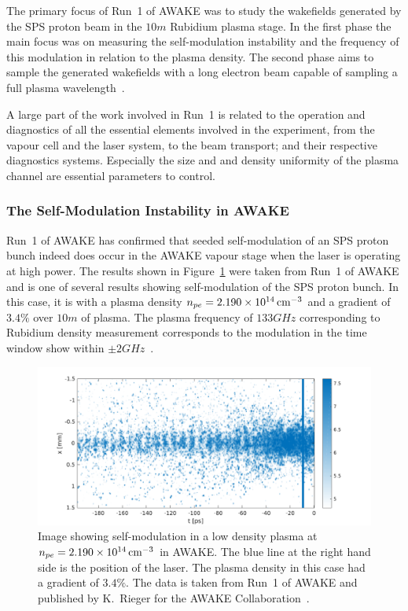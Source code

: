 The primary focus of Run~1 of AWAKE was to study the wakefields generated by the SPS proton beam in the $10\unit{m}$ Rubidium plasma stage.
In the first phase the main focus was on measuring the self-modulation instability and the frequency of this modulation in relation to the plasma density.
The second phase aims to sample the generated wakefields with a long electron beam capable of sampling a full plasma wavelength~\cite{adli:2016a}.

A large part of the work involved in Run~1 is related to the operation and diagnostics of all the essential elements involved in the experiment, from the vapour cell and the laser system, to the beam transport; and their respective diagnostics systems.
Especially the size and and density uniformity of the plasma channel are essential parameters to control.

\subsubsection{The Self-Modulation Instability in AWAKE}
\label{WFA:SMI}

Run~1 of AWAKE has confirmed that seeded self-modulation of an SPS proton bunch indeed does occur in the AWAKE vapour stage when the laser is operating at high power.
The results shown in Figure~\ref{Fig:SMI:Results} were taken from Run~1 of AWAKE and is one of several results showing self-modulation of the SPS proton bunch.
In this case, it is with a plasma density $n_{pe} = 2.190\times 10^{14}\,\mathrm{cm}^{-3}$ and a gradient of $3.4\%$ over $10\unit{m}$ of plasma.
The plasma frequency of $133\unit{GHz}$ corresponding to Rubidium density measurement corresponds to the modulation in the time window show within $\pm 2\unit{GHz}$~\cite{awake_collaboration:2018a}.

\begin{figure}[hbt]
    \centering
    \includegraphics[width=0.99\linewidth,trim={0mm 0mm 0mm 0mm},clip]{figures/SMI-Rieger}
    \caption{\label{Fig:SMI:Results}
        Image showing self-modulation in a low density plasma at $n_{pe} = 2.190\times 10^{14}\,\mathrm{cm}^{-3}$ in AWAKE.
        The blue line at the right hand side is the position of the laser.
        The plasma density in this case had a gradient of $3.4\%$.
        The data is taken from Run~1 of AWAKE and published by K.~Rieger for the AWAKE Collaboration~\cite{adli:2018a}.
    }
\end{figure}

